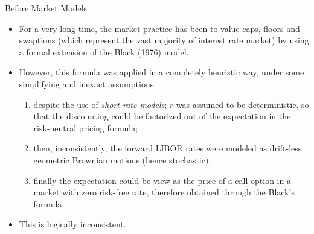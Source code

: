 \documentclass{beamer}
\begin{document}
\begin{frame}{Before Market Models}
	\begin{itemize}
		\item For a very long time, the market practice has been to value caps, floors and swaptions (which represent the vast majority of interest rate market) by using a formal extension of the Black (1976) model. 
		\item However, this formula was applied in a completely heuristic way, under some simplifying and inexact assumptions.
		\begin{enumerate}
			\item despite the use of \emph{short rate models}; $r$ was assumed to be deterministic, so that the discounting could be factorized out of the expectation in the risk-neutral pricing formula; 
			\item then, inconsistently, the forward LIBOR rates were modeled as drift-less geometric Brownian motions (hence stochastic);
			\item finally the expectation could be view as the price of a call option in a market with zero risk-free rate, therefore obtained through the Black’s formula.
		\end{enumerate} 
		\item This is logically inconsistent.
	\end{itemize}
\end{frame}
\end{document}
